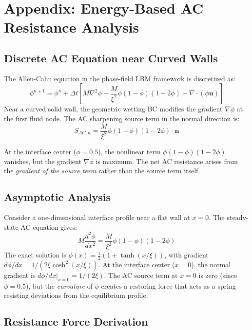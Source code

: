 \section{Appendix: Energy-Based AC Resistance Analysis}\label{sec:appendix_ac_resistance}

\subsection{Discrete AC Equation near Curved Walls}

The Allen-Cahn equation in the phase-field LBM framework is discretized as:
\begin{equation}\label{eq:app_ac}
    \phi^{n+1} = \phi^n + \Delta t \left[ M \nabla^2 \phi - \frac{M}{\xi^2} \phi(1-\phi)(1-2\phi) + \nabla \cdot (\phi \mathbf{u}) \right]
\end{equation}
Near a curved solid wall, the geometric wetting BC modifies the gradient $\nabla\phi$ at the first fluid node. The AC sharpening source term in the normal direction is:
\begin{equation}\label{eq:app_ac_source}
    S_{AC,n} = \frac{M}{\xi^2} \phi(1-\phi)(1-2\phi) \cdot \mathbf{n}
\end{equation}

At the interface center ($\phi = 0.5$), the nonlinear term $\phi(1-\phi)(1-2\phi)$ vanishes, but the gradient $\nabla\phi$ is maximum. The net AC resistance arises from the \emph{gradient of the source term} rather than the source term itself.

\subsection{Asymptotic Analysis}

Consider a one-dimensional interface profile near a flat wall at $x=0$. The steady-state AC equation gives:
\begin{equation}\label{eq:app_ac_1d}
    M \frac{d^2\phi}{dx^2} = \frac{M}{\xi^2} \phi(1-\phi)(1-2\phi)
\end{equation}
The exact solution is $\phi(x) = \frac{1}{2}(1 + \tanh(x/\xi))$, with gradient $d\phi/dx = 1/(2\xi \cosh^2(x/\xi))$. At the interface center ($x=0$), the normal gradient is $\left.d\phi/dx\right|_{x=0} = 1/(2\xi)$. The AC source term at $x=0$ is zero (since $\phi=0.5$), but the \emph{curvature} of $\phi$ creates a restoring force that acts as a spring resisting deviations from the equilibrium profile.

\subsection{Resistance Force Derivation}

